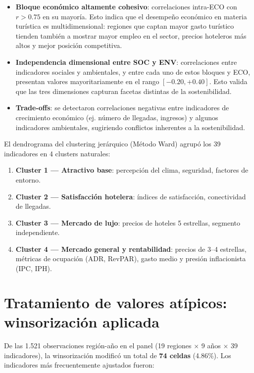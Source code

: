 \begin{itemize}
    \item \textbf{Bloque económico altamente cohesivo}: correlaciones intra-ECO con $r > 0.75$ en su mayoría. Esto indica que el desempeño económico en materia turística es multidimensional: regiones que captan mayor gasto turístico tienden también a mostrar mayor empleo en el sector, precios hoteleros más altos y mejor posición competitiva.
    \item \textbf{Independencia dimensional entre SOC y ENV}: correlaciones entre indicadores sociales y ambientales, y entre cada uno de estos bloques y ECO, presentan valores mayoritariamente en el rango $[-0.20, +0.40]$. Esto valida que las tres dimensiones capturan facetas distintas de la sostenibilidad.
    \item \textbf{Trade-offs}: se detectaron correlaciones negativas entre indicadores de crecimiento económico (ej. número de llegadas, ingresos) y algunos indicadores ambientales, sugiriendo conflictos inherentes a la sostenibilidad.
\end{itemize}

El dendrograma del clustering jerárquico (Método Ward) agrupó los 39 indicadores en 4 clusters naturales:

\begin{enumerate}
    \item \textbf{Cluster 1 — Atractivo base}: percepción del clima, seguridad, factores de entorno.
    \item \textbf{Cluster 2 — Satisfacción hotelera}: índices de satisfacción, conectividad de llegadas.
    \item \textbf{Cluster 3 — Mercado de lujo}: precios de hoteles 5 estrellas, segmento independiente.
    \item \textbf{Cluster 4 — Mercado general y rentabilidad}: precios de 3--4 estrellas, métricas de ocupación (ADR, RevPAR), gasto medio y presión inflacionista (IPC, IPH).
\end{enumerate}

\section{Tratamiento de valores atípicos: winsorización aplicada}

De las 1.521 observaciones región-año en el panel (19 regiones $\times$ 9 años $\times$ 39 indicadores), la winsorización modificó un total de \textbf{74 celdas} (4.86\%). Los indicadores más frecuentemente ajustados fueron:

